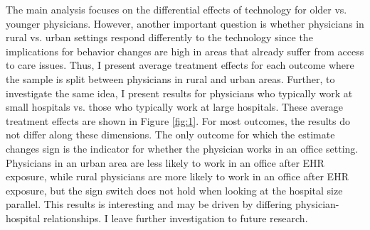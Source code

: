\documentclass[12pt]{article}
\begin{document}
The main analysis focuses on the differential effects of technology for older vs. younger physicians. However, another important question is whether physicians in rural vs. urban settings respond differently to the technology since the implications for behavior changes are high in areas that already suffer from access to care issues. Thus, I present average treatment effects for each outcome where the sample is split between physicians in rural and urban areas. Further, to investigate the same idea, I present results for physicians who typically work at small hospitals vs. those who typically work at large hospitals. These average treatment effects are shown in Figure \ref{fig:1}. For most outcomes, the results do not differ along these dimensions. The only outcome for which the estimate changes sign is the indicator for whether the physician works in an office setting. Physicians in an urban area are less likely to work in an office after EHR exposure, while rural physicians are more likely to work in an office after EHR exposure, but the sign switch does not hold when looking at the hospital size parallel. This results is interesting and may be driven by differing physician-hospital relationships. I leave further investigation to future research. 
\end{document}
